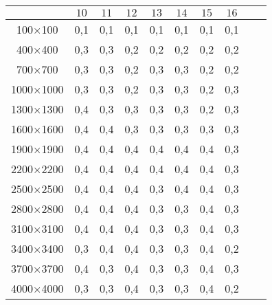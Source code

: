 \documentclass[14pt,a4paper]{extarticle} %
\begin{document}
\begin{table}[h!] 
\captionsetup{labelformat = empty}
\centering
 \begin{tabular}{|c|c|c|c|c|c|c|c|c|c|}\hline
              &$10$ &$11$&$12$&$13$&$14$ &$15$ &$16$   \\ \hline
100$\times$100   &0,1 &0,1 &0,1 &0,1 &0,1 &0,1 &0,1 \\ \hline
400$\times$400   &0,3 &0,3 &0,2 &0,2 &0,2 &0,2 &0,2 \\ \hline
700$\times$700   &0,3 &0,3 &0,2 &0,3 &0,3 &0,2 &0,2 \\ \hline
1000$\times$1000 &0,3 &0,3 &0,2 &0,3 &0,3 &0,2 &0,3 \\ \hline
1300$\times$1300 &0,4 &0,3 &0,3 &0,3 &0,3 &0,2 &0,3 \\ \hline
1600$\times$1600 &0,4 &0,4 &0,3 &0,3 &0,3 &0,3 &0,3 \\ \hline
1900$\times$1900 &0,4 &0,4 &0,4 &0,4 &0,4 &0,4 &0,3 \\ \hline
2200$\times$2200 &0,4 &0,4 &0,4 &0,4 &0,4 &0,4 &0,3 \\ \hline
2500$\times$2500 &0,4 &0,4 &0,4 &0,3 &0,4 &0,4 &0,3 \\ \hline
2800$\times$2800 &0,4 &0,4 &0,4 &0,3 &0,3 &0,4 &0,3 \\ \hline
3100$\times$3100 &0,4 &0,4 &0,4 &0,3 &0,3 &0,4 &0,3 \\ \hline
3400$\times$3400 &0,3 &0,4 &0,4 &0,3 &0,3 &0,4 &0,2 \\ \hline
3700$\times$3700 &0,4 &0,3 &0,4 &0,3 &0,3 &0,4 &0,3 \\ \hline
4000$\times$4000 &0,3 &0,3 &0,4 &0,3 &0,3 &0,4 &0,2 \\ \hline            	
 \end{tabular}
\label{tab:exp3-ef-2}
\end{table}
\end{document}

